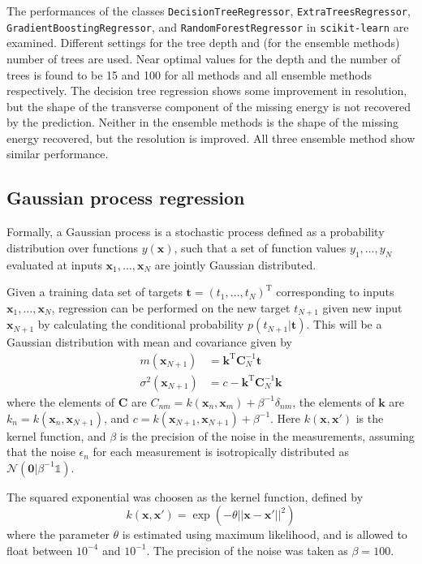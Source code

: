 \documentclass[twocolumn]{scrartcl}
\begin{document}
The performances of the classes \texttt{DecisionTreeRegressor}, \texttt{ExtraTreesRegressor}, \texttt{GradientBoostingRegressor}, and \texttt{RandomForestRegressor} in \texttt{scikit-learn} are examined. Different settings for the tree depth and (for the ensemble methods) number of trees are used. Near optimal values for the depth and the number of trees is found to be 15 and 100 for all methods and all ensemble methods respectively. The decision tree regression shows some improvement in resolution, but the shape of the transverse component of the missing energy is not recovered by the prediction. Neither in the ensemble methods is the shape of the missing energy recovered, but the resolution is improved. All three ensemble method show similar performance.

\subsection{Gaussian process regression}
Formally, a Gaussian process is a stochastic process defined as a probability distribution over functions $y(\mathbf x)$, such that a set of function values $y_1, \ldots, y_N$ evaluated at inputs $\mathbf x_1, \ldots, \mathbf x_N$ are jointly Gaussian distributed.

Given a training data set of targets $\mathbf t = (t_1,\ldots,t_N)^\text{T}$ corresponding to inputs $\mathbf x_1,\ldots,\mathbf x_N$, regression can be performed on the new target $t_{N+1}$ given new input $\mathbf x_{N+1}$ by calculating the conditional probability $p(t_{N+1}|\mathbf t)$. This will be a Gaussian distribution with mean and covariance given by
\begin{align}
    m(\mathbf x_{N+1}) &= \mathbf k^\text{T} \mathbf C^{-1}_N \mathbf t \\
    \sigma^2(\mathbf x_{N+1}) &= c - \mathbf k^\text{T} \mathbf C^{-1}_N \mathbf k
\end{align}
where the elements of $\mathbf C$ are $C_{nm} = k(\mathbf x_n, \mathbf x_m) + \beta^{-1}\delta_{nm}$, the elements of $\mathbf k$ are $k_n = k(\mathbf x_n, \mathbf x_{N+1})$, and $c = k(\mathbf x_{N+1}, \mathbf x_{N+1}) + \beta^{-1}$. Here $k(\mathbf x, \mathbf x')$ is the kernel function, and $\beta$ is the precision of the noise in the measurements, assuming that the noise $\epsilon_n$ for each measurement is isotropically distributed as $\mathcal N(\mathbf 0 | \beta^{-1}\mathbb 1)$.

The squared exponential was choosen as the kernel function, defined by
\begin{equation}
    k(\mathbf x, \mathbf x') = \exp( -\theta ||\mathbf x - \mathbf x'||^2 )
\end{equation}
where the parameter $\theta$ is estimated using maximum likelihood, and is allowed to float between $10^{-4}$ and $10^{-1}$. The precision of the noise was taken as $\beta = 100$. 
\end{document}
